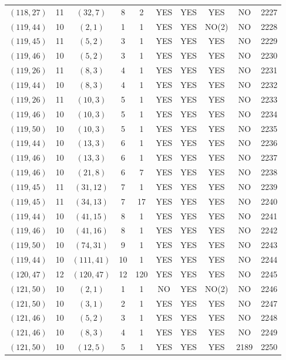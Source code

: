\begin{longtable}{|c|c|c|c|c|c|c|c|c|c|}
$(118, 27)$ & 11 & $(32, 7)$ & 8 & 2 & YES & YES & YES & NO & 2227\\
$(119, 44)$ & 10 & $(2, 1)$ & 1 & 1 & YES & YES & NO(2) & NO & 2228\\
$(119, 45)$ & 11 & $(5, 2)$ & 3 & 1 & YES & YES & YES & NO & 2229\\
$(119, 46)$ & 10 & $(5, 2)$ & 3 & 1 & YES & YES & YES & NO & 2230\\
$(119, 26)$ & 11 & $(8, 3)$ & 4 & 1 & YES & YES & YES & NO & 2231\\
$(119, 44)$ & 10 & $(8, 3)$ & 4 & 1 & YES & YES & YES & NO & 2232\\
$(119, 26)$ & 11 & $(10, 3)$ & 5 & 1 & YES & YES & YES & NO & 2233\\
$(119, 46)$ & 10 & $(10, 3)$ & 5 & 1 & YES & YES & YES & NO & 2234\\
$(119, 50)$ & 10 & $(10, 3)$ & 5 & 1 & YES & YES & YES & NO & 2235\\
$(119, 44)$ & 10 & $(13, 3)$ & 6 & 1 & YES & YES & YES & NO & 2236\\
$(119, 46)$ & 10 & $(13, 3)$ & 6 & 1 & YES & YES & YES & NO & 2237\\
$(119, 46)$ & 10 & $(21, 8)$ & 6 & 7 & YES & YES & YES & NO & 2238\\
$(119, 45)$ & 11 & $(31, 12)$ & 7 & 1 & YES & YES & YES & NO & 2239\\
$(119, 45)$ & 11 & $(34, 13)$ & 7 & 17 & YES & YES & YES & NO & 2240\\
$(119, 44)$ & 10 & $(41, 15)$ & 8 & 1 & YES & YES & YES & NO & 2241\\
$(119, 46)$ & 10 & $(41, 16)$ & 8 & 1 & YES & YES & YES & NO & 2242\\
$(119, 50)$ & 10 & $(74, 31)$ & 9 & 1 & YES & YES & YES & NO & 2243\\
$(119, 44)$ & 10 & $(111, 41)$ & 10 & 1 & YES & YES & YES & NO & 2244\\
$(120, 47)$ & 12 & $(120, 47)$ & 12 & 120 & YES & YES & YES & NO & 2245\\
$(121, 50)$ & 10 & $(2, 1)$ & 1 & 1 & NO & YES & NO(2) & NO & 2246\\
$(121, 50)$ & 10 & $(3, 1)$ & 2 & 1 & YES & YES & YES & NO & 2247\\
$(121, 46)$ & 10 & $(5, 2)$ & 3 & 1 & YES & YES & YES & NO & 2248\\
$(121, 46)$ & 10 & $(8, 3)$ & 4 & 1 & YES & YES & YES & NO & 2249\\
$(121, 50)$ & 10 & $(12, 5)$ & 5 & 1 & YES & YES & YES & 2189 & 2250\\

\end{longtable}
